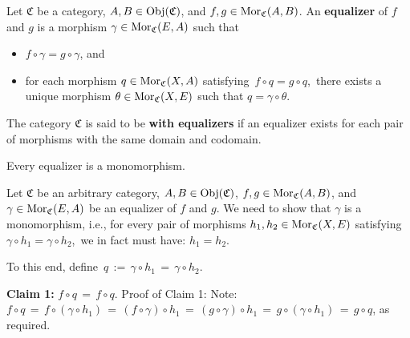 
\vskip 0.5cm
\begin{definition}[Equalizer]
\mbox{}
\vskip 0.1cm
\noindent
Let $\mathfrak{C}$ be a category, $A, B \in \textnormal{Obj}(\mathfrak{C})$, and $f, g \in \textnormal{Mor}_{\mathfrak{C}}(A,B)$.
\vskip 0.1cm
\noindent
An \textbf{equalizer} of $f$ and $g$ is a morphism $\gamma \in \textnormal{Mor}_{\mathfrak{C}}(E,A)$ such that
\begin{itemize}
\item
	$f \circ \gamma = g \circ \gamma$, and
\item
	for each morphism $q \in \textnormal{Mor}_{\mathfrak{C}}(X,A)$ satisfying \,$f \circ q = g \circ q$,\,
	there exists a unique morphism $\theta \in \textnormal{Mor}_{\mathfrak{C}}(X,E)$ such that
	$q = \gamma \circ \theta$.
	\begin{center}
	\end{center}
\end{itemize}
The category $\mathfrak{C}$ is said to be \textbf{with equalizers}
if an equalizer exists for each pair of morphisms with the same domain and codomain.
\end{definition}


\vskip 0.5cm
\begin{lemma}\label{EqualizersAreMonomorphisms}
\mbox{}
\vskip 0.1cm
\noindent
Every equalizer is a monomorphism.
\end{lemma}
\proof
Let $\mathfrak{C}$ be an arbitrary category, $A, B \in \textnormal{Obj}(\mathfrak{C})$, $f, g \in \textnormal{Mor}_{\mathfrak{C}}(A,B)$, and
$\gamma \in \textnormal{Mor}_{\mathfrak{C}}(E,A)$ be an equalizer of $f$ and $g$.
We need to show that $\gamma$ is a monomorphism, i.e.,
for every pair of morphisms $h_{1}, h_{2} \in \textnormal{Mor}_{\mathfrak{C}}(X,E)$
satisfying \,$\gamma \circ h_{1} = \gamma \circ h_{2}$,\,
we in fact must have: $h_{1} = h_{2}$.

\vskip 0.3cm
\noindent
To this end, define \,$q \,:=\, \gamma \circ h_{1} \,=\, \gamma \circ h_{2}$.\,

\vskip 0.3cm
\noindent
\textbf{Claim 1:}\; $f \circ q \,=\, f \circ q$.
\vskip 0.1cm
\noindent
Proof of Claim 1:\;
Note: $f \circ q \,=\, f \circ (\gamma \circ h_{1}) \,=\, (f \circ \gamma) \circ h_{1} \,=\, (g \circ \gamma) \circ h_{1} \,=\, g \circ (\gamma \circ h_{1}) \,=\, g \circ q$, as required.

